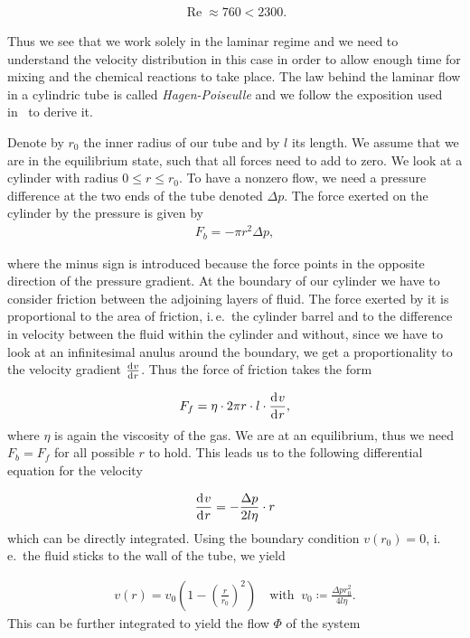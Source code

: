 \begin{align*}
  \operatorname{Re} \approx 760 < 2300.
\end{align*}

Thus we see that we work solely in the laminar regime and we need to
understand the velocity distribution in this case in order to allow
enough time for mixing and the chemical reactions to take place. The
law behind the laminar flow in a cylindric tube is called
\emph{Hagen-Poiseulle} and we follow the exposition used
in~\cite{gerthsen} to derive it.

Denote by $r_0$ the inner radius of our tube and by $l$ its length. We
assume that we are in the equilibrium state, such that all forces need
to add to zero. We look at a cylinder with radius $0 \leq r \leq
r_0$. To have a nonzero flow, we need a pressure difference at the two
ends of the tube denoted $\Delta p$. The force exerted on the cylinder
by the pressure is given by
\begin{align*}
  F_b = - \pi r^2 \Delta p,
\end{align*}

where the minus sign is introduced because the force points in the
opposite direction of the pressure gradient. At the boundary of our
cylinder we have to consider friction between the adjoining layers of
fluid. The force exerted by it is proportional to the area of
friction, i.\,e.\ the cylinder barrel and to the difference in velocity
between the fluid within the cylinder and without, since we have to
look at an infinitesimal anulus around the boundary, we get a
proportionality to the velocity gradient $\frac{\d[v]}{\d[r]}$. Thus
the force of friction takes the form

\begin{align*}
  F_f = \eta \cdot 2\pi r \cdot l \cdot \frac{\d[v]}{\d[r]},
\end{align*}
where $\eta$ is again the viscosity of the gas.  We are at an
equilibrium, thus we need $F_b = F_f$ for all possible $r$ to
hold. This leads us to the following differential equation for the
velocity

\begin{align*}
  \frac{\d[v]}{\d[r]} = - \frac{\Delta p}{2l\eta} \cdot r
\end{align*}
which can be directly integrated. Using the boundary condition $v(r_0)
= 0$, i.\,e.\ the fluid sticks to the wall of the tube, we yield

\begin{align}
  v(r) = v_0 \left ( 1 - \left( \frac{r}{r_0} \right)^2 \right) \quad
  \text{with }\ v_0 \coloneqq \frac{\Delta p r_0^2}{4 l \eta}. \label{eq:v}
\end{align}
This can be further integrated to yield the flow $\Phi$ of the system

